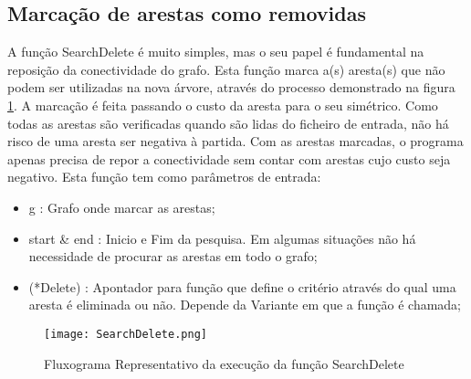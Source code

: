 \documentclass[14pt]{article}
\begin{document}
    \subsection[SearchDelete]{Marcação de arestas como removidas}\label{subsec:SearchDelete}
    A função SearchDelete é muito simples, mas o seu papel é fundamental na reposição da conectividade do grafo.
    Esta função marca a(s) aresta(s) que não podem ser utilizadas na nova árvore, através do processo demonstrado na figura \ref{fig:SearchDelete}.
    A marcação é feita passando o custo da aresta para o seu simétrico.
    Como todas as arestas são verificadas quando são lidas do ficheiro de entrada, não há risco de uma aresta ser negativa à partida.
    Com as arestas marcadas, o programa apenas precisa de repor a conectividade sem contar com arestas cujo custo seja negativo.
    Esta função tem como parâmetros de entrada:
    \begin{itemize}
        \item g : Grafo onde marcar as arestas;
        \item start & end : Inicio e Fim da pesquisa. Em algumas situações não há necessidade de procurar as arestas em todo o grafo;
        \item (*Delete) : Apontador para função que define o critério através do qual uma aresta é eliminada ou não. Depende da Variante em que a função é chamada;
    \end{itemize}
    \begin{figure}[H]
        \centering
        \label{fig:SearchDelete}
        \texttt{[image: SearchDelete.png]}
        \caption { Fluxograma Representativo da execução da função SearchDelete }
    \end{figure}
\end{document}
